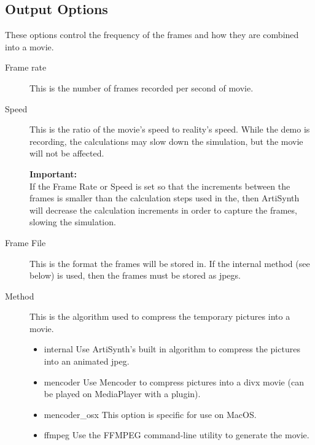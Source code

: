 \documentclass{article}
\begin{document}
\subsection{Output Options}

These options control the frequency of the frames and how they are
combined into a movie.

\begin{description}

\item[Frame rate]\mbox{}

This is the number of frames recorded per second of movie.

\item[Speed]\mbox{}

This is the ratio of the movie's speed to reality's speed. While the
demo is recording, the calculations may slow down the simulation, but
the movie will not be affected.

\begin{sideblock}
{\bf Important:}\\
If the {\sf Frame Rate} or {\sf Speed} is set so that the
increments between the frames is smaller than the calculation steps
used in the, then ArtiSynth will decrease the calculation increments
in order to capture the frames, slowing the simulation.
\end{sideblock}

\item[Frame File]\mbox{}

This is the format the frames will be stored in. If the internal
method (see below) is used, then the frames must be stored as jpegs.

\item[Method]\mbox{}

This is the algorithm used to compress the temporary pictures into a movie.

\begin{itemize}

\item {\sf internal} Use ArtiSynth's built in algorithm to compress the
pictures into an animated jpeg.

\item {\sf mencoder} Use Mencoder to compress pictures into a divx movie
(can be played on MediaPlayer with a plugin).

\item {\sf mencoder\_osx} This option is specific for use on MacOS.

\item {\sf ffmpeg} Use the FFMPEG command-line utility to generate
the movie.


\end{itemize}
\end{description}
\end{document}
